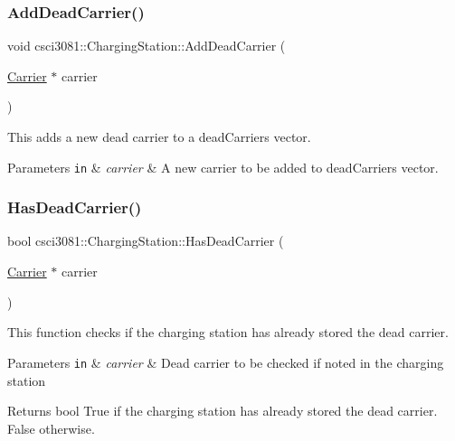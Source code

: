 \subsubsection{\texorpdfstring{Add\+Dead\+Carrier()}{AddDeadCarrier()}}
{\footnotesize\ttfamily void csci3081\+::\+Charging\+Station\+::\+Add\+Dead\+Carrier (\begin{DoxyParamCaption}\item[{\hyperlink{classcsci3081_1_1Carrier}{Carrier} $\ast$}]{carrier }\end{DoxyParamCaption})}



This adds a new dead carrier to a dead\+Carriers vector. 


\begin{DoxyParams}[1]{Parameters}
\mbox{\tt in}  & {\em carrier} & A new carrier to be added to dead\+Carriers vector. \\
\hline
\end{DoxyParams}
\mbox{\label{classcsci3081_1_1ChargingStation_adb8fc616c40a8b8fd2b8e1259453ca9e}} 
\subsubsection{\texorpdfstring{Has\+Dead\+Carrier()}{HasDeadCarrier()}}
{\footnotesize\ttfamily bool csci3081\+::\+Charging\+Station\+::\+Has\+Dead\+Carrier (\begin{DoxyParamCaption}\item[{\hyperlink{classcsci3081_1_1Carrier}{Carrier} $\ast$}]{carrier }\end{DoxyParamCaption})}



This function checks if the charging station has already stored the dead carrier. 


\begin{DoxyParams}[1]{Parameters}
\mbox{\tt in}  & {\em carrier} & Dead carrier to be checked if noted in the charging station \\
\hline
\end{DoxyParams}
\begin{DoxyReturn}{Returns}
bool True if the charging station has already stored the dead carrier. False otherwise. 
\end{DoxyReturn}
\mbox{\label{classcsci3081_1_1ChargingStation_a10e78c7ca569a682b91498df6b5a9dd9}} 
